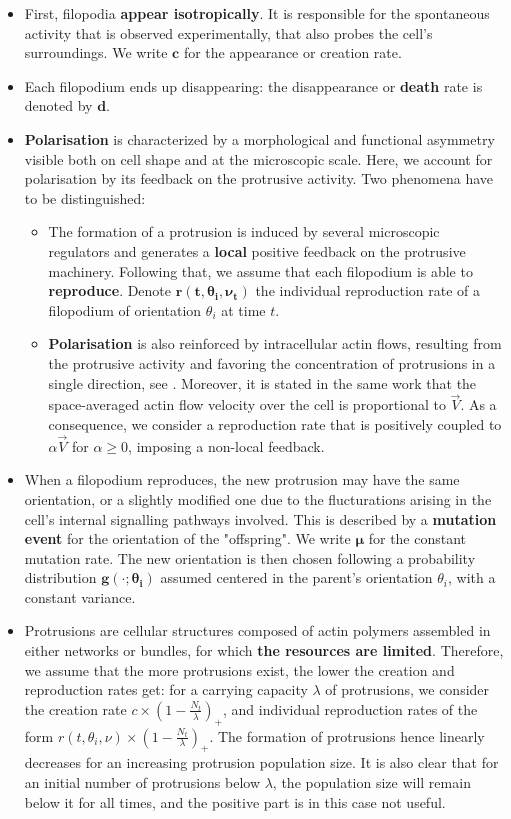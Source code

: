 \documentclass[a4paper,11pt]{article}
\newcommand{\itemr}{\item[$\rightarrow$]}
\begin{document}
\begin{itemize}
\item First, filopodia \textbf{appear isotropically}. It is responsible for the spontaneous activity that is observed experimentally, that also probes the cell's surroundings. We write $\mathbf{c}$ for the appearance or creation rate.\par 
\item Each filopodium ends up disappearing: the disappearance or \textbf{death} rate is denoted by $\mathbf{d}$.
\item \textbf{Polarisation} is characterized by a morphological and functional asymmetry visible both on cell shape and at the microscopic scale. Here, we account for polarisation by its feedback on the protrusive activity. Two phenomena have to be distinguished:
\begin{itemize}
\itemr The formation of a protrusion is induced by several microscopic regulators and generates a \textbf{local} positive feedback on the protrusive machinery. Following that, we assume that each filopodium is able to \textbf{reproduce}. Denote $\mathbf{r(t,\theta_i,\nu_t)}$ the individual reproduction rate of a filopodium of orientation $\theta_i$ at time $t$.
 
\itemr \textbf{Polarisation} is also reinforced by intracellular actin flows, resulting from the protrusive activity and favoring the concentration of protrusions in a single direction, see \cite{Maiuri2015Actin_flows_med}. Moreover, it is stated in the same work that the space-averaged actin flow velocity over the cell is proportional to $\vec{V}$. As a consequence, we consider a reproduction rate that is positively coupled to $\alpha \vec{V}$ for $\alpha \geq 0$, imposing a non-local feedback. 
\end{itemize}
\item When a filopodium reproduces, the new protrusion may have the same orientation, or a slightly modified one due to the flucturations arising in the cell's internal signalling pathways involved. This is described by a \textbf{mutation event} for the orientation of the "offspring". We write $\boldsymbol{\mu}$ for the constant mutation rate. The new orientation is then chosen following a probability distribution $\mathbf{g(\cdot;\theta_i)}$ assumed centered in the parent's orientation $\theta_i$, with a constant variance.
\item Protrusions are cellular structures composed of actin polymers assembled in either networks or bundles, for which \textbf{the resources are limited}. Therefore, we assume that the more protrusions exist, the lower the creation and reproduction rates get: for a carrying capacity $\lambda$ of protrusions, we consider the creation rate $c\times (1-\frac{N_t}{\lambda})_+$, and individual reproduction rates of the form $r(t,\theta_i,\nu) \times (1-\frac{N_t}{\lambda})_+$. The formation of protrusions hence linearly decreases for an increasing protrusion population size. It is also clear that for an initial number of protrusions below $\lambda$, the population size will remain below it for all times, and the positive part is in this case not useful.
\end{itemize}
\end{document}
